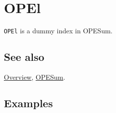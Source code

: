 \documentclass[../FeynCalcManual.tex]{subfiles}
\begin{document}
\hypertarget{opel}{%
\section{OPEl}\label{opel}}

\texttt{OPEl} is a dummy index in OPESum.

\subsection{See also}

\hyperlink{toc}{Overview}, \hyperlink{opesum}{OPESum}.

\subsection{Examples}
\end{document}
